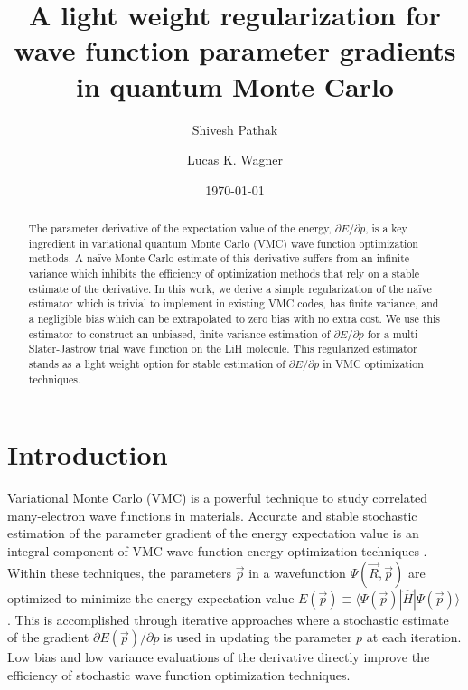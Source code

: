 \documentclass[twocolumn]{revtex4-1}
\begin{document}
\title{A light weight regularization for wave function parameter gradients
\\ in quantum Monte Carlo}

\author{Shivesh Pathak}

\author{Lucas K. Wagner}

\date{\today}
\begin{abstract}
The parameter derivative of the expectation value of the energy, $\partial E/\partial p$, is a key ingredient in variational quantum Monte Carlo (VMC) wave function optimization methods.
A na\"ive Monte Carlo estimate of this derivative suffers from an infinite variance which inhibits the efficiency of optimization methods that rely on a stable estimate of the derivative.
In this work, we derive a simple regularization of the na\"ive estimator which is trivial to implement in existing VMC codes, has finite variance, and a negligible bias which can be extrapolated to zero bias with no extra cost.
We use this estimator to construct an unbiased, finite variance estimation of $\partial E/\partial p$ for a multi-Slater-Jastrow trial wave function on the LiH molecule.
This regularized estimator stands as a light weight option for stable estimation of $\partial E/\partial p$ in VMC optimization techniques.
\end{abstract}
\maketitle 

\section{Introduction}

Variational Monte Carlo (VMC) is a powerful technique to study correlated many-electron wave functions in materials.
Accurate and stable stochastic estimation of the parameter gradient of the energy expectation value is an integral component of VMC wave function energy optimization techniques \cite{PhysRevB.64.024512, doi:10.1063/1.1604379, Toulouse2007, Umrigar2005, Umrigar2007, Toulouse2008}.
Within these techniques, the parameters $\vec{p}$ in a wavefunction $\Psi(\vec{R},\vec{p})$ are optimized to minimize the energy expectation value $E(\vec{p}) \equiv \langle \Psi(\vec{p})|\hat{H} |\Psi(\vec{p})\rangle$.
This is accomplished through iterative approaches where a stochastic estimate of the gradient $\partial E(\vec{p})/\partial p$ is used in updating the parameter $p$ at each iteration. 
Low bias and low variance evaluations of the derivative directly improve the efficiency of stochastic wave function optimization techniques. 
\end{document}
